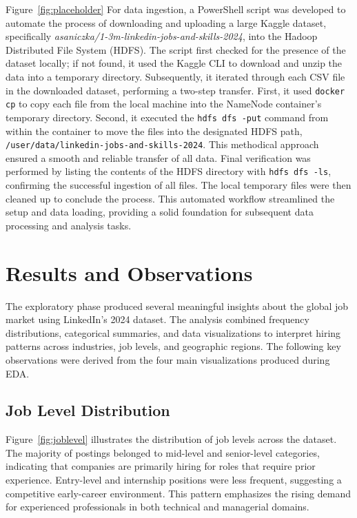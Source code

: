 \documentclass[conference]{IEEEtran}
\begin{document}
Figure~\ref{fig:placeholder} For data ingestion, a PowerShell script was developed to automate the process of downloading and uploading a large Kaggle dataset, specifically \textit{asaniczka/1-3m-linkedin-jobs-and-skills-2024}, into the Hadoop Distributed File System (HDFS). The script first checked for the presence of the dataset locally; if not found, it used the Kaggle CLI to download and unzip the data into a temporary directory. Subsequently, it iterated through each CSV file in the downloaded dataset, performing a two-step transfer. First, it used \texttt{docker cp} to copy each file from the local machine into the NameNode container's temporary directory. Second, it executed the \texttt{hdfs dfs -put} command from within the container to move the files into the designated HDFS path, \texttt{/user/data/linkedin-jobs-and-skills-2024}. This methodical approach ensured a smooth and reliable transfer of all data. Final verification was performed by listing the contents of the HDFS directory with \texttt{hdfs dfs -ls}, confirming the successful ingestion of all files. The local temporary files were then cleaned up to conclude the process. This automated workflow streamlined the setup and data loading, providing a solid foundation for subsequent data processing and analysis tasks.

\section{\textbf{Results and Observations}}
The exploratory phase produced several meaningful insights about the global job market using LinkedIn’s 2024 dataset. The analysis combined frequency distributions, categorical summaries, and data visualizations to interpret hiring patterns across industries, job levels, and geographic regions. The following key observations were derived from the four main visualizations produced during EDA.

\subsection{Job Level Distribution}
Figure~\ref{fig:joblevel} illustrates the distribution of job levels across the dataset. The majority of postings belonged to mid-level and senior-level categories, indicating that companies are primarily hiring for roles that require prior experience. Entry-level and internship positions were less frequent, suggesting a competitive early-career environment. This pattern emphasizes the rising demand for experienced professionals in both technical and managerial domains.
\end{document}
